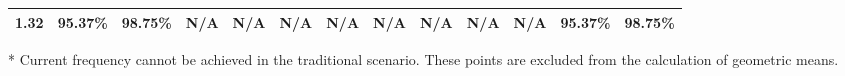 \documentclass[journal]{IEEEtran}
\begin{document}
\begin{table}[htbp]
\begin{threeparttable}
\begin{tabular}{c|cc|cc|cc|cc|cc||cc}
     1.32 & 95.37\%	& 98.75\%   & N/A\tnote{*}	  &	 N/A\tnote{*}	    &	 N/A\tnote{*}	    &	 N/A\tnote{*}   & N/A\tnote{*}   & N/A\tnote{*}    &    N/A\tnote{*}   & N/A\tnote{*} & 95.37\%	& 98.75\% \\
     \hline
     \hline
   \end{tabular}
   \normalsize
   \begin{tablenotes}
   \footnotesize
    \item[*] Current frequency cannot be achieved in the traditional scenario. These points are excluded from the calculation of geometric means.
   \end{tablenotes}
   \end{threeparttable}
   \label{Ratio_MRE}
 \end{table}
\end{document}
